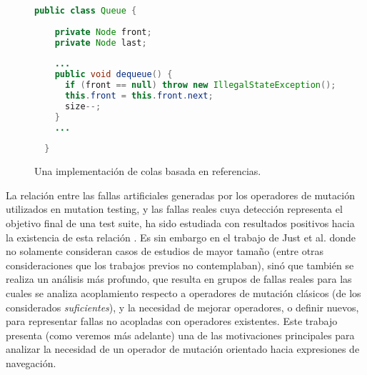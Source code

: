 \begin{figure}[H]
	\small
	\begin{lstlisting}[frame=single, mathescape=true, language=Java,basicstyle={},xleftmargin=.01\textwidth,xrightmargin=.01\textwidth]
  public class Queue {
    
    private Node front;
    private Node last;
    
    ...
    public void dequeue() {
      if (front == null) throw new IllegalStateException();
      this.front = this.front.next;
      size--;
    }
    ...
    
  }
	\end{lstlisting}
	\caption[Ejemplo de motivaci\'on]{Una implementaci\'on de colas basada en referencias.}
	\label{figures.motivation.queue-class}
\end{figure}

La relaci\'on entre las fallas artificiales generadas por los operadores de mutaci\'on utilizados en mutation testing, y las fallas reales cuya detecci\'on representa el objetivo final de una test suite, ha sido estudiada con resultados positivos hacia la existencia de esta relaci\'on \cite{bibliography.mutation.evaluation.DaranT96, bibliography.mutation.evaluation.HAndrews05, bibliography.mutation.evaluation.mutationInTestingExperimentsNaminK11}. Es sin embargo en el trabajo de Just et al. \cite{bibliography.mutation.evaluation.valid-substitute} donde no solamente consideran casos de estudios de mayor tama\~no (entre otras consideraciones que los trabajos previos no contemplaban), sin\'o que tambi\'en se realiza un an\'alisis m\'as profundo, que resulta en grupos de fallas reales para las cuales se analiza acoplamiento respecto a operadores de mutaci\'on cl\'asicos (de los considerados \emph{suficientes}), y la necesidad de mejorar operadores, o definir nuevos, para representar fallas no acopladas con operadores existentes. Este trabajo presenta (como veremos m\'as adelante) una de las motivaciones principales para analizar la necesidad de un operador de mutaci\'on orientado hacia expresiones de navegaci\'on.

